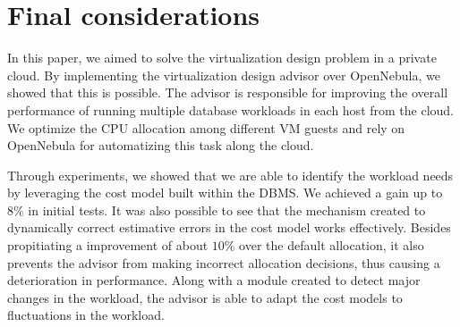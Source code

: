 \chapter{\textbf{Final considerations}}
\label{chap:final}

In this paper, we aimed to solve the virtualization design problem in a private cloud. By implementing the virtualization design advisor over OpenNebula, we showed that this is possible. The advisor is responsible for improving the overall performance of running multiple database workloads in each host from the cloud. We optimize the CPU allocation among different VM guests and rely on OpenNebula for automatizing this task along the cloud.

Through experiments, we showed that we are able to identify the workload needs by leveraging the cost model built within the DBMS. We achieved a gain up to $8\%$ in initial tests. It was also possible to see that the mechanism created to dynamically correct estimative errors in the cost model works effectively. Besides propitiating a improvement of about $10\%$ over the default allocation, it also prevents the advisor from making incorrect allocation decisions, thus causing a deterioration in performance. Along with a module created to detect major changes in the workload, the advisor is able to adapt the cost models to fluctuations in the workload.




